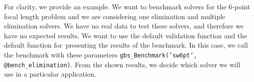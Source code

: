 For clarity, we provide an example. We want to benchmark solvers for the 6-point focal length problem \cite{6pt} and we are considering one elimination and multiple elimination solvers. We have no real data to test these solvers, and therefore we have no expected results. We want to use the default validation function and the default function for~presenting the results of the benchmark. In this case, we call the benchmark with these parameters \texttt{gbs\_Benchmark('sw6pt', @bench\_elimination)}. From the shown results, we decide which solver we will use in a particular application.
